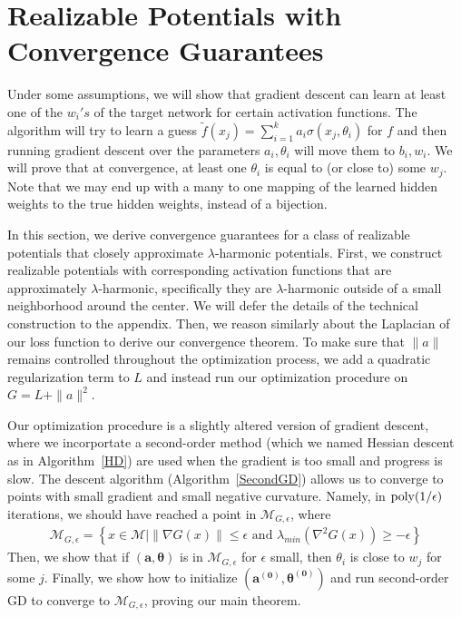 
\section{Realizable Potentials with Convergence Guarantees}
\label{sec:almost-harmonic}
{\color{red} 
Under some assumptions, we
will show that gradient descent can learn at least one of the $w_i's$
of the target network for certain activation functions. The algorithm
will try to learn a guess
$\widetilde{f}(x_j) = \sum_{i=1}^k a_i \sigma(x_j,\theta_i)$ for $f$
and then running gradient descent over the parameters $a_i, \theta_i$
will move them to $b_i, w_i$. We will prove that at convergence, at
least one $\theta_i$ is equal to (or close to) some $w_j$. Note that
we may end up with a many to one mapping of the learned hidden weights
to the true hidden weights, instead of a bijection.


}
%
In this section, we derive convergence guarantees for a class of realizable potentials that closely approximate $\lambda$-harmonic potentials. First, we construct realizable potentials with corresponding activation functions that are approximately $\lambda$-harmonic, specifically they are $\lambda$-harmonic outside of a small neighborhood around the center. We will defer the details of the technical construction to the appendix. Then, we reason similarly about the Laplacian of our loss function to derive our convergence theorem. To make sure that $\|a\|$ remains controlled throughout the optimization process, we add a quadratic regularization term to $L$ and instead run our optimization procedure on $G = L + \|a\|^2$.

Our optimization procedure is a slightly altered version of gradient descent, where we incorportate a second-order method (which we named Hessian descent as in Algorithm~\ref{HD}) are used when the gradient is too small and progress is slow. The descent algorithm (Algorithm~\ref{SecondGD}) allows us to converge to points with small gradient and small negative curvature. Namely, in $\mathrm{poly}(1/\epsilon)$ iterations, we should have reached a point in $\mathcal{M}_{G, \epsilon}$, where 
%
%
\begin{align*}
\mathcal{M}_{G, \epsilon} = \left\{x\in \mathcal{M} \Big| \|\nabla G(x)\|
  \leq \epsilon \text{ and } \lambda_{min}(\nabla^2 G(x)) \geq
  -\epsilon\right\}
  \end{align*}
Then, we show that if $(\boldsymbol{a,\theta})$ is in $\mathcal{M}_{G, \epsilon}$ for $\epsilon$ small, then $\theta_i$ is close to $w_j$ for some $j$. Finally, we show how to initialize $(\boldsymbol{a^{(0)},\theta^{(0)}})$ and run second-order GD to converge to $\mathcal{M}_{G,\epsilon}$, proving our main theorem.

